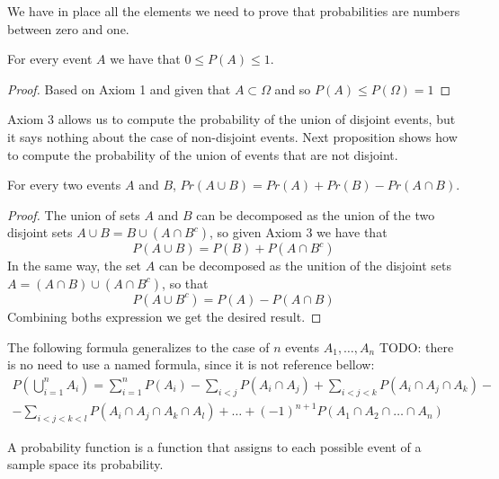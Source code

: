 We have in place all the elements we need to prove that probabilities are numbers between zero and one.

\begin{proposition}
For every event $A$ we have that $0 \leq P \left( A \right) \leq 1$.
\end{proposition}
\begin{proof}
Based on Axiom 1 and given that $A \subset \Omega$ and so $P \left( A \right) \leq P \left( \Omega \right) = 1$
\end{proof}

Axiom 3 allows us to compute the probability of the union of disjoint events, but it says nothing about the case of non-disjoint events. Next proposition shows how to compute the probability of the union of events that are not disjoint.

\begin{proposition}
For every two events $A$ and $B$, $Pr\left(A\cup B\right)=Pr\left(A\right)+Pr\left(B\right)-Pr\left(A\cap B\right)$.
\end{proposition}
\begin{proof}
The union of sets $A$ and $B$ can be decomposed as the union of the two disjoint sets $A \cup B = B \cup \left( A \cap B^c \right)$, so given Axiom 3 we have that
\[
P \left( A \cup B \right) = P \left( B \right) + P \left( A \cap B^c \right)
\]
In the same way, the set $A$ can be decomposed as the unition of the disjoint sets $A = \left( A \cap B \right) \cup \left( A \cap B^c \right)$, so that
\[
P \left( A \cup B^c \right) = P \left( A \right) - P \left( A \cap B \right)
\]
Combining boths expression we get the desired result.
\end{proof}

The following formula generalizes to the case of $n$ events $A_1, \ldots, A_n$ {\color{red} TODO: there is no need to use a named formula, since it is not reference bellow}:
\begin{multline}
P \left( \bigcup_{i=1}^n A_i \right) = \sum_{i=1}^n P \left( A_i \right) - \sum_{i<j} P \left( A_i \cap A_j \right) + \sum_{i<j<k} P \left( A_i \cap A_j \cap A_k \right) - \\
 - \sum_{i<j<k<l} P \left( A_i \cap A_j \cap A_k \cap A_l \right) + \ldots +  (-1)^{n+1} P \left( A_1 \cap A_2 \cap \ldots \cap A_n \right) 
\end{multline}

A probability function is a function that assigns to each possible event of a sample space its probability.

